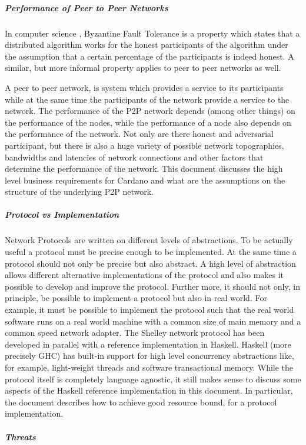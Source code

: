 \documentclass{report}
\newcommand{\wip}[1]{\color{magenta}{#1}\color{black}}
\theoremstyle{definition}{
  \newtheorem{lemma}{Lemma}[section] %
  \newtheorem{definition}[lemma]{Definition}
}
\theoremstyle{theorem}{
  \newtheorem{invariant}[lemma]{Invariant}
  \newtheorem{proofobligation}[lemma]{Proof Obligation}
}
\numberwithin{equation}{lemma}
\begin{document}

\subparagraph{Performance of Peer to Peer Networks}
In computer science , Byzantine Fault Tolerance is a property which states
that a distributed algorithm works for the honest participants of the algorithm
under the assumption that a certain percentage of the participants is indeed honest.
A similar, but more informal property applies to peer to peer networks as well.

A peer to peer network, is system which provides a service to its participants while at the same
time the participants of the network provide a service to the network.
The performance of the P2P network depends (among other things) on the performance of the nodes,
while the performance of a node also depends on the performance of the network.
Not only are there honest and adversarial participant, but there is also a huge variety of
possible network topographies, bandwidths and latencies of network connections and other
factors that determine the performance of the network.
This document discusses the high level business requirements for Cardano and what are the
assumptions on the structure of the underlying P2P network.

\subparagraph{Protocol vs Implementation}
Network Protocols are written on different levels of abstractions.
To be actually useful a protocol must be precise enough to be implemented.
At the same time a protocol should not only be precise but also abstract.
A high level of abstraction allows different alternative implementations of the protocol
and also makes it possible to develop and improve the protocol.
Further more, it should not only, in principle, be possible to implement a protocol
but also in real world.
For example, it must be possible to implement the protocol
such that the real world software runs on a real world machine with a common size of main memory
and a common speed network adapter.
The Shelley network protocol has been developed in parallel with a reference implementation in Haskell.
Haskell (more precisely GHC) has built-in support for high level concurrency abstractions
like, for example, light-weight threads and software transactional memory.
While the protocol itself is completely language agnostic, it still makes sense to discuss some
aspects of the Haskell reference implementation in this document.
In particular, the document describes how to achieve good resource bound, for a protocol implementation.

\subparagraph{Threats}
\wip{Reference the Threats section.
  'eclipse' can be detered}
\end{document}
